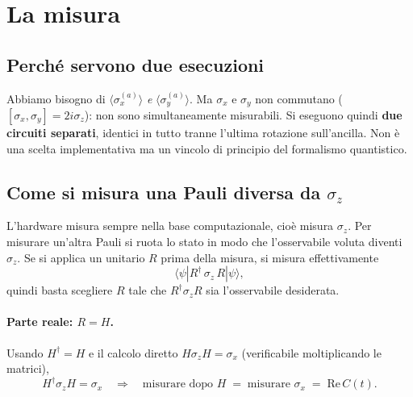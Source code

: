 \documentclass[11pt,a4paper]{article}
\begin{document}
\section{La misura}

\subsection{Perché servono due esecuzioni}

Abbiamo bisogno di $\langle\sigma_x^{(a)}\rangle$ \emph{e} $\langle\sigma_y^{(a)}\rangle$. Ma
$\sigma_x$ e $\sigma_y$ non commutano ($[\sigma_x,\sigma_y]=2i\sigma_z$): non sono
simultaneamente misurabili. Si eseguono quindi \textbf{due circuiti separati}, identici in tutto
tranne l'ultima rotazione sull'ancilla. Non è una scelta implementativa ma un vincolo di
principio del formalismo quantistico.

\subsection{Come si misura una Pauli diversa da $\sigma_z$}

L'hardware misura sempre nella base computazionale, cioè misura $\sigma_z$. Per misurare
un'altra Pauli si ruota lo stato in modo che l'osservabile voluta diventi $\sigma_z$. Se si
applica un unitario $R$ prima della misura, si misura effettivamente
\begin{equation}
\langle\psi|R^\dagger\,\sigma_z\,R|\psi\rangle,
\end{equation}
quindi basta scegliere $R$ tale che $R^\dagger\sigma_z R$ sia l'osservabile desiderata.

\paragraph{Parte reale: $R=H$.} Usando $H^\dagger=H$ e il calcolo diretto
$H\sigma_z H=\sigma_x$ (verificabile moltiplicando le matrici),
\begin{equation}
H^\dagger\sigma_z H=\sigma_x
\quad\Longrightarrow\quad
\text{misurare dopo }H \;=\; \text{misurare }\sigma_x \;=\; \mathrm{Re}\,C(t).
\end{equation}
\end{document}
